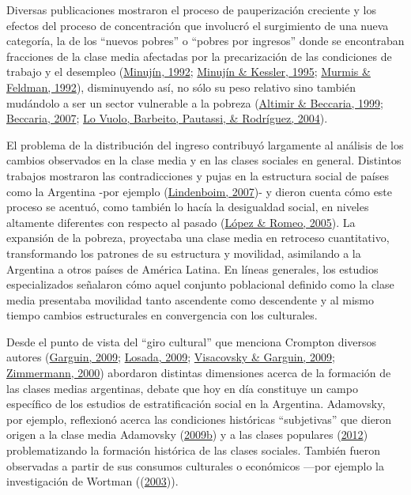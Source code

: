 \documentclass[
]{article}
\begin{document}
Diversas publicaciones mostraron el proceso de pauperización creciente y los efectos del proceso de concentración que involucró el surgimiento de una nueva categoría, la de los ``nuevos pobres'' o ``pobres por ingresos'' donde se encontraban fracciones de la clase media afectadas por la precarización de las condiciones de trabajo y el desempleo (\protect\hyperlink{ref-Minujin1992}{Minujín, 1992}; \protect\hyperlink{ref-Minujin1995}{Minujín \& Kessler, 1995}; \protect\hyperlink{ref-Murmis1992}{Murmis \& Feldman, 1992}), disminuyendo así, no sólo su peso relativo sino también mudándolo a ser un sector vulnerable a la pobreza (\protect\hyperlink{ref-Altimir1999}{Altimir \& Beccaria, 1999}; \protect\hyperlink{ref-Beccaria2007}{Beccaria, 2007}; \protect\hyperlink{ref-LoVuolo2004c}{Lo Vuolo, Barbeito, Pautassi, \& Rodríguez, 2004}).

El problema de la distribución del ingreso contribuyó largamente al análisis de los cambios observados en la clase media y en las clases sociales en general. Distintos trabajos mostraron las contradicciones y pujas en la estructura social de países como la Argentina -por ejemplo (\protect\hyperlink{ref-Lindenboim2007}{Lindenboim, 2007})- y dieron cuenta cómo este proceso se acentuó, como también lo hacía la desigualdad social, en niveles altamente diferentes con respecto al pasado (\protect\hyperlink{ref-Lopez2005a}{López \& Romeo, 2005}). La expansión de la pobreza, proyectaba una clase media en retroceso cuantitativo, transformando los patrones de su estructura y movilidad, asimilando a la Argentina a otros países de América Latina. En líneas generales, los estudios especializados señalaron cómo aquel conjunto poblacional definido como la clase media presentaba movilidad tanto ascendente como descendente y al mismo tiempo cambios estructurales en convergencia con los culturales.

Desde el punto de vista del ``giro cultural'' que menciona Crompton diversos autores (\protect\hyperlink{ref-Garguin2009}{Garguin, 2009}; \protect\hyperlink{ref-Losada2009}{Losada, 2009}; \protect\hyperlink{ref-Visacovsky2009}{Visacovsky \& Garguin, 2009}; \protect\hyperlink{ref-Zimmermann2000}{Zimmermann, 2000}) abordaron distintas dimensiones acerca de la formación de las clases medias argentinas, debate que hoy en día constituye un campo específico de los estudios de estratificación social en la Argentina. Adamovsky, por ejemplo, reflexionó acerca las condiciones históricas ``subjetivas'' que dieron origen a la clase media Adamovsky (\protect\hyperlink{ref-Adamovsky2009b}{2009b}) y a las clases populares (\protect\hyperlink{ref-Adamovsky2012}{2012}) problematizando la formación histórica de las clases sociales. También fueron observadas a partir de sus consumos culturales o económicos ---por ejemplo la investigación de Wortman ((\protect\hyperlink{ref-Wortman2003}{2003})).
\end{document}

